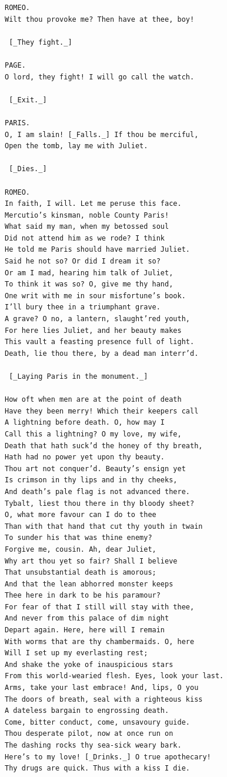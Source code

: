 \documentclass{article}
\begin{document}
\begin{verbatim}
ROMEO.
Wilt thou provoke me? Then have at thee, boy!

 [_They fight._]

PAGE.
O lord, they fight! I will go call the watch.

 [_Exit._]

PARIS.
O, I am slain! [_Falls._] If thou be merciful,
Open the tomb, lay me with Juliet.

 [_Dies._]

ROMEO.
In faith, I will. Let me peruse this face.
Mercutio’s kinsman, noble County Paris!
What said my man, when my betossed soul
Did not attend him as we rode? I think
He told me Paris should have married Juliet.
Said he not so? Or did I dream it so?
Or am I mad, hearing him talk of Juliet,
To think it was so? O, give me thy hand,
One writ with me in sour misfortune’s book.
I’ll bury thee in a triumphant grave.
A grave? O no, a lantern, slaught’red youth,
For here lies Juliet, and her beauty makes
This vault a feasting presence full of light.
Death, lie thou there, by a dead man interr’d.

 [_Laying Paris in the monument._]

How oft when men are at the point of death
Have they been merry! Which their keepers call
A lightning before death. O, how may I
Call this a lightning? O my love, my wife,
Death that hath suck’d the honey of thy breath,
Hath had no power yet upon thy beauty.
Thou art not conquer’d. Beauty’s ensign yet
Is crimson in thy lips and in thy cheeks,
And death’s pale flag is not advanced there.
Tybalt, liest thou there in thy bloody sheet?
O, what more favour can I do to thee
Than with that hand that cut thy youth in twain
To sunder his that was thine enemy?
Forgive me, cousin. Ah, dear Juliet,
Why art thou yet so fair? Shall I believe
That unsubstantial death is amorous;
And that the lean abhorred monster keeps
Thee here in dark to be his paramour?
For fear of that I still will stay with thee,
And never from this palace of dim night
Depart again. Here, here will I remain
With worms that are thy chambermaids. O, here
Will I set up my everlasting rest;
And shake the yoke of inauspicious stars
From this world-wearied flesh. Eyes, look your last.
Arms, take your last embrace! And, lips, O you
The doors of breath, seal with a righteous kiss
A dateless bargain to engrossing death.
Come, bitter conduct, come, unsavoury guide.
Thou desperate pilot, now at once run on
The dashing rocks thy sea-sick weary bark.
Here’s to my love! [_Drinks._] O true apothecary!
Thy drugs are quick. Thus with a kiss I die.


\end{verbatim}
\end{document}
